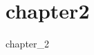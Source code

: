 \documentclass[10pt,a4j,dvipdfmx,report]{jsarticle}
\begin{document}
\chapter{chapter2} %
\label{cha:chapter2}

chapter\_2

\end{document}
